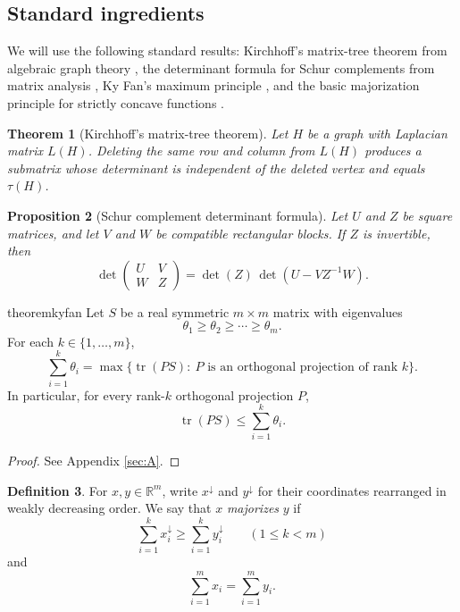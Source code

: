 \documentclass[twoside, reqno]{amsart}
\newtheorem{theorem}{Theorem}
\newtheorem{proposition}[theorem]{Proposition}
\theoremstyle{definition}
\newtheorem{definition}[theorem]{Definition}
\theoremstyle{remark}
\newcommand{\RR}{\mathbb R}
\begin{document}
\subsection*{Standard ingredients}
We will use the following standard results: Kirchhoff's matrix-tree theorem 
from algebraic graph theory \cite[Section~13.2]{GodsilRoyle}, the determinant 
formula for Schur complements from matrix analysis 
\cite[Section~0.8.5]{HornJohnson}, Ky Fan's maximum principle 
\cite[Exercise II.1.13]{Bhatia}, and the basic majorization principle 
for strictly concave functions \cite[Section~3C]{MarshallOlkinArnold}.

\begin{theorem}[Kirchhoff's matrix-tree theorem]\label{thm:kirchhoff}
Let $H$ be a graph with Laplacian matrix $L(H)$. Deleting the same row 
and column from $L(H)$ produces a submatrix whose determinant is independent 
of the deleted vertex and equals $\tau(H)$.
\end{theorem}

\begin{proposition}[Schur complement determinant formula]
\label{prop:schur-complement}
Let $U$ and $Z$ be square matrices, 
and let $V$ and $W$ be compatible rectangular blocks. 
If $Z$ is invertible, then
\[
\det\begin{pmatrix}
U & V\\
W & Z
\end{pmatrix}
=
\det(Z)\,\det(U-VZ^{-1}W).
\]
\end{proposition}

\begin{restatable}{theorem}{kyfan}
\label{thm:ky-fan}
Let $S$ be a real symmetric $m\times m$ matrix with eigenvalues
\[
\theta_1\ge \theta_2\ge \cdots \ge \theta_m.
\]
For each $k\in\{1,\dots,m\}$,
\[
\sum_{i=1}^k \theta_i
=
\max\bigl\{\operatorname{tr}(PS):\ P \text{ is an orthogonal projection of rank }k\bigr\}.
\]
In particular, for every rank-$k$ orthogonal projection $P$,
\[
\operatorname{tr}(PS)\le \sum_{i=1}^k \theta_i.
\]
\end{restatable}
\begin{proof}See Appendix \ref{sec:A}.\end{proof}

\begin{definition}\label{def:majorization}
For $x,y\in\RR^m$, write $x^\downarrow$ and $y^\downarrow$ for their coordinates 
rearranged in weakly decreasing order. We say that $x$ \emph{majorizes} $y$ if
\[
\sum_{i=1}^k x_i^\downarrow\ge \sum_{i=1}^k y_i^\downarrow\qquad (1\le k<m)
\]
and
\[
\sum_{i=1}^m x_i=\sum_{i=1}^m y_i.
\]
\end{definition}
\end{document}
